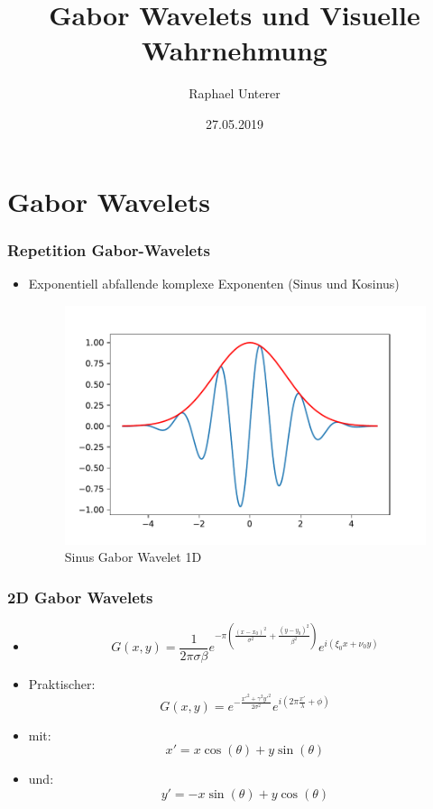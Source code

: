 \documentclass{beamer}
\title{Gabor Wavelets und Visuelle Wahrnehmung}
\author{Raphael Unterer}
\institute{Mathematisches Seminar 2018}
\date{27.05.2019}
\begin{document}
\begin{frame}
\titlepage
\end{frame}


\section{Gabor Wavelets}

\begin{frame}
	\frametitle{Repetition Gabor-Wavelets}
	\begin{itemize}
		\item[] Exponentiell abfallende komplexe Exponenten (Sinus und Kosinus)
		\begin{figure}
			\centering
			\includegraphics[width=0.7\linewidth]{images/gabor_1d}
			\caption{Sinus Gabor Wavelet 1D}
			\label{fig:gabor1d}
		\end{figure}
	\end{itemize}
\end{frame}

\begin{frame}
	\frametitle{2D Gabor Wavelets}
	\begin{itemize}
		\item[]
		\begin{equation}
			G(x,y)=\frac{1}{2\pi\sigma\beta}
			e^{-\pi(\frac{(x-x_{0})^{2}}{\sigma^{2}}+\frac{(y-y_{0})^{2}}{\beta^{2}})}
			e^{i(\xi_{0}x+\nu_{0}y)}
		\end{equation}
		\pause
		\item[] Praktischer:
		\begin{equation}
			G(x,y)=e^{-\frac{x'^{2}+\gamma^{2}y'^{2}}{2\sigma^{2}}}
			e^{i(2\pi\frac{x'}{\lambda} + \phi)}
		\end{equation}
		\pause
		\item[] mit:
		\begin{equation}
		x'=x\cos(\theta)+y\sin(\theta)
		\end{equation}
		\item[] und:
		\begin{equation}
		y'=-x\sin(\theta)+y\cos(\theta)
		\end{equation}
			
	\end{itemize}
\end{frame}
\end{document}
